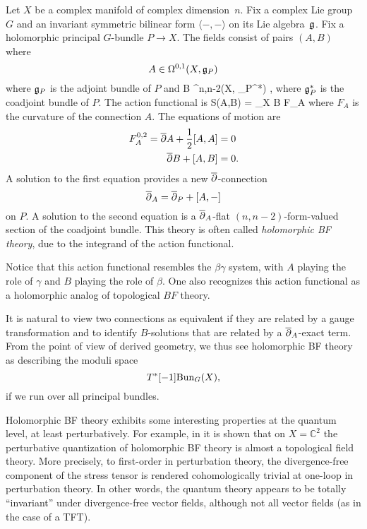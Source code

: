 \documentclass[11pt]{amsart}
\def\C{{\mathbb{C}}}
\begin{document}
Let $X$ be a complex manifold of complex dimension~$n$.
Fix a complex Lie group $G$ and an invariant symmetric bilinear form $\langle-,-\rangle$ on its Lie algebra~$\mathfrak g$.
Fix a holomorphic principal $G$-bundle $P \to X$.
The fields consist of pairs $(A,B)$ where 
\[
A \in \Omega^{0,1}(X, \mathfrak g_P)
\] 
where $\mathfrak g_P$ is the adjoint bundle of $P$ and
\beqn
B \in \Omega^{n,n-2}(X, \fg_P^*) ,
\eeqn
where $\mathfrak g_P^*$ is the coadjoint bundle of $P$. 
The action functional is 
\beqn
S(A,B) = \int_X \langle B \wedge F_A \rangle
\eeqn
where $F_A$ is the curvature of the connection $A$.
The equations of motion are
\begin{align*}
F_A^{0,2} = {\overline{\partial}} A + \frac12 [A,A] & = 0 \\
 {\overline{\partial}} B + [A,B] & = 0.
\end{align*}
A solution to the first equation provides a new ${\overline{\partial}}$-connection 
\[
{\overline{\partial}}_A = {\overline{\partial}}_P + [A,-] 
\]
on $P$.
A solution to the second equation is a ${\overline{\partial}}_A$-flat $(n,n-2)$-form-valued section of the coadjoint bundle.
This theory is often called {\em holomorphic BF theory}, due to the integrand of the action functional.

\begin{rmk}
Notice that this action functional resembles the $\beta\gamma$ system, 
with $A$ playing the role of $\gamma$ and $B$ playing the role of $\beta$.
One also recognizes this action functional as a holomorphic analog of topological $BF$ theory. 
\end{rmk}

It is natural to view two connections as equivalent if they are related by a gauge transformation
and to identify $B$-solutions that are related by a ${\overline{\partial}}_A$-exact term.
From the point of view of derived geometry,
we thus see holomorphic BF theory as describing the moduli space
\[
T^*[-1] {\rm Bun}_G(X),
\]
if we run over all principal bundles.

\begin{rmk}
Holomorphic BF theory exhibits some interesting properties at the quantum level,
at least perturbatively.
For example, in \cite[\S3.2]{BGKWWY} it is shown that on $X = \C^2$ 
the perturbative quantization of holomorphic BF theory is almost a topological field theory. 
More precisely, to first-order in perturbation theory, 
the divergence-free component of the stress tensor is rendered cohomologically trivial at one-loop in perturbation theory.
In other words, the quantum theory appears to be totally ``invariant'' under divergence-free vector fields,
although not all vector fields (as in the case of a TFT).
\end{rmk}
\end{document}
